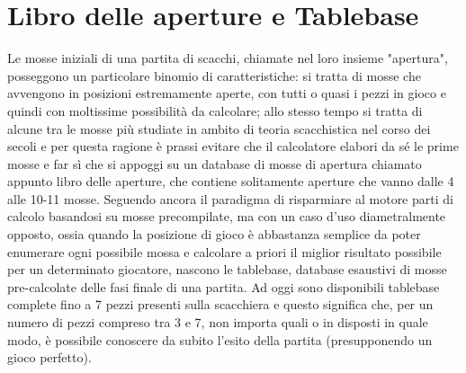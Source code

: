 \section {Libro delle aperture e Tablebase}
Le mosse iniziali di una partita di scacchi, chiamate nel loro insieme "apertura", posseggono un particolare binomio di caratteristiche: si tratta di mosse che avvengono in posizioni estremamente aperte, con tutti o quasi i pezzi
in gioco e quindi con moltissime possibilità da calcolare; allo stesso tempo si tratta di alcune tra le mosse più studiate in ambito di teoria scacchistica nel corso dei secoli e per questa ragione è prassi evitare che
il calcolatore elabori da sé le prime mosse e far sì che si appoggi su un database di mosse di apertura chiamato appunto libro delle aperture, che contiene solitamente aperture che vanno dalle 4 alle 10-11 mosse.
Seguendo ancora il paradigma di risparmiare al motore parti di calcolo basandosi su mosse precompilate, ma con un caso d'uso diametralmente opposto, ossia quando la posizione di gioco è abbastanza semplice
da poter enumerare ogni possibile mossa e calcolare a priori il miglior risultato possibile per un determinato giocatore, nascono le tablebase, database esaustivi di mosse pre-calcolate delle fasi finale di una 
partita. Ad oggi sono disponibili tablebase complete fino a 7 pezzi presenti sulla scacchiera e questo significa che, per un numero di pezzi compreso tra 3 e 7, non importa quali o in disposti in quale modo,
è possibile conoscere da subito l'esito della partita (presupponendo un gioco perfetto).
